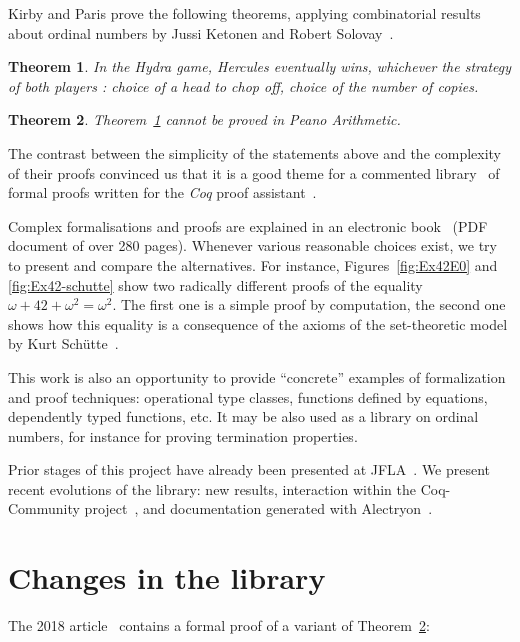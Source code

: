 \documentclass{easychair}
\newtheorem{theorem}{Theorem}
\begin{document}

Kirby and Paris prove the following theorems, applying
combinatorial results about ordinal numbers by Jussi Ketonen and Robert Solovay~\cite{KS81}.

\begin{theorem}
  In the Hydra game, Hercules eventually wins, whichever the strategy of both players :
  choice of a head to chop off, choice of the number of copies. 
 \label{kp:thm1}
\end{theorem}

\begin{theorem}
  Theorem~\ref{kp:thm1} cannot be proved in Peano Arithmetic. \label{kp:thm2}
\end{theorem}

The contrast between the simplicity of the statements above and the complexity of their proofs convinced us that it is a good theme for a commented library~\cite{HydraBattles} of formal proofs written for the \textit{Coq} proof assistant~\cite{Coq}. 

Complex formalisations and proofs are explained in an
  electronic book~\cite{HydraBook} (PDF document of over 280 pages). Whenever various reasonable choices exist, we try to present and compare the alternatives.
  For instance, Figures~\ref{fig:Ex42E0} and \ref{fig:Ex42-schutte} show two radically different proofs of the equality
  $\omega+42+\omega^2=\omega^2$. The first one is a simple proof by computation, the second one shows how this equality
  is a consequence of the axioms of the set-theoretic model  by Kurt Schütte~\cite{schutte}. 

This work is also an opportunity to 
 provide ``concrete'' examples of formalization and proof techniques: operational type classes, functions defined by  equations, dependently typed functions, etc. It may be also used as a library on ordinal numbers, for instance for proving termination properties.

 Prior stages of this project have already been presented at
 JFLA~\cite{PCiota, JFLA2018paper}.
We present recent evolutions of the library: new results, interaction within the Coq-Community project~\cite{CoqCommunity}, and documentation generated with Alectryon~\cite{alectryonpaper, alectryongithub}.

\section{Changes in the library}
The 2018 article~\cite{JFLA2018paper} contains a formal proof of  a variant of Theorem~\ref{kp:thm2}:
\end{document}
